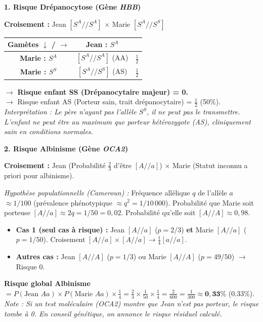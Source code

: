 \documentclass[11pt]{article}
\begin{document}
\begin{exoresolu}
\medskip
\noindent \textbf{1. Risque Drépanocytose (Gène \emph{HBB})}
\begin{center}
\textbf{Croisement :} Jean $[S^A//S^A]$ $\times$ Marie $[S^A//S^S]$
\end{center}
\begin{center}
\begin{tabular}{|c|c|c|}\hline
\rowcolor{popblueL} \textbf{Gamètes $\downarrow$ / $\rightarrow$} & \textbf{Jean : $S^A$} &  \\ \hline
\textbf{Marie : $S^A$} & $[S^A//S^A]$ (AA) & $\frac{1}{2}$ \\ \hline
\textbf{Marie : $S^S$} & $[S^A//S^S]$ (AS) & $\frac{1}{2}$ \\ \hline
\end{tabular}
\end{center}
$\rightarrow$ \textbf{Risque enfant SS (Drépanocytaire majeur) = 0.} \\
$\rightarrow$ Risque enfant AS (Porteur sain, trait drépanocytaire) = $\frac{1}{2}$ (50\%). \\
\textit{Interprétation : Le père n'ayant pas l'allèle $S^S$, il ne peut pas le transmettre. L'enfant ne peut être au maximum que porteur hétérozygote (AS), cliniquement sain en conditions normales.}

\medskip
\noindent \textbf{2. Risque Albinisme (Gène \emph{OCA2})}
\begin{center}
\textbf{Croisement :} Jean (Probabilité $\frac{2}{3}$ d'être $[A//a]$) $\times$ Marie (Statut inconnu a priori pour albinisme).
\end{center}
\textit{Hypothèse populationnelle (Cameroun) :} Fréquence allélique $q$ de l'allèle $a$ $\approx 1/100$ (prévalence phénotypique $\approx q^2 = 1/10\,000$). Probabilité que Marie soit porteuse $[A//a] \approx 2q = 1/50 = 0,02$. Probabilité qu'elle soit $[A//A] \approx 0,98$.
\begin{itemize}
    \item \textbf{Cas 1 (seul cas à risque) :} Jean $[A//a]$ ($p=2/3$) \textbf{et} Marie $[A//a]$ ($p=1/50$). Croisement $[A//a] \times [A//a] \rightarrow \frac{1}{4} [a//a]$.
    \item \textbf{Autres cas :} Jean $[A//A]$ ($p=1/3$) ou Marie $[A//A]$ ($p=49/50$) $\rightarrow$ Risque 0.
\end{itemize}
\textbf{Risque global Albinisme} $= P(\text{Jean } Aa) \times P(\text{Marie } Aa) \times \frac{1}{4} = \frac{2}{3} \times \frac{1}{50} \times \frac{1}{4} = \frac{2}{600} = \frac{1}{300} \approx \mathbf{0,33\%}$ (\num{0,33}\%).
\textit{Note : Si un test moléculaire (\emph{OCA2}) montre que Jean n'est pas porteur, le risque tombe à 0. En conseil génétique, on annonce le risque résiduel calculé.}


\end{exoresolu}
\end{document}
